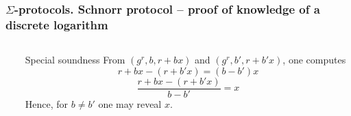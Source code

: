 \documentclass[aspectratio=169]{beamer}
\begin{document}
\begin{frame}
  \frametitle{$\Sigma$-protocols. Schnorr protocol -- proof of knowledge of a discrete logarithm}
  \begin{columns}
    \begin{column}{.5\linewidth}
    \end{column}
    \begin{column}{.5\linewidth}
      \begin{block}{Special soundness}
        From $(g^r, b, r + bx)$ and $(g^r, b', r + b'x)$, one computes
        \[
          r + bx - (r + b'x)  = (b - b')x
        \]
        \[
          \frac{r + bx - (r + b'x)}{b - b'} = x
        \]
        Hence, for $b \neq b'$ one may reveal $x$.
      \end{block}
    \end{column}
  \end{columns}
\end{frame}
\end{document}

